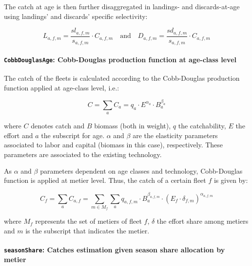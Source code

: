 	The catch at age is then further disaggregated in landings- and discards-at-age using landings' and discards' specific selectivity:
		
	\begin{equation}  \label{eq:land_disc}
		L_{a,f,m} = \frac{sl_{a,f,m}}{s_{a,f,m}}\cdot C_{a,f,m} \quad  \text{and} \quad  D_{a,f,m} = \frac{sd_{a,f,m}}{s_{a,f,m}}\cdot C_{a,f,m}
	\end{equation}

 	
 	\paragraph{\texttt{CobbDouglasAge}: Cobb-Douglas production function at age-class level} \hspace{0pt} \smallskip

 	 	The  catch of the fleets is calculated according to the Cobb-Douglas production function 
		applied at age-class level, i.e.:
		
\begin{equation}  \label{eq:Cobb_Doug_age}
	C = \sum_a C_a = q_a\cdot E^{\alpha_a} \cdot B_a^{\beta_a}
\end{equation}

	\noindent where $C$ denotes catch and $B$  biomass (both in weight), $q$ the catchability, $E$ the effort
	and $a$ the subscript for age. $\alpha$ and $\beta$ are the elasticity parameters associated to labor and capital 
	(biomass in this case), respectively. These parameters are associated
	to the existing technology. 

	As $\alpha$ and $\beta$ parameters dependent on age classes and technology, Cobb-Douglas function is
	applied at metier level. Thus, the catch of a certain fleet $f$ is given by:

\begin{equation}  \label{eq:Cobb_Doug_fleet_age}
	C_f = \sum_a C_{a,f} = \sum_{m \in M_f} \sum_a q_{a,f,m}\cdot B_a^{\beta _{a,f,m}} \cdot (E_f\cdot \delta_{f,m})^{\alpha_{a,f,m}}
\end{equation}
 
	\noindent where $M_f$ represents the set of metiers of fleet $f$, $\delta$ the effort share among metiers and $m$ 
	is the subscript that indicates the metier.

 	\paragraph{\texttt{seasonShare}: Catches estimation given season share allocation by metier} \hspace{0pt} \smallskip

